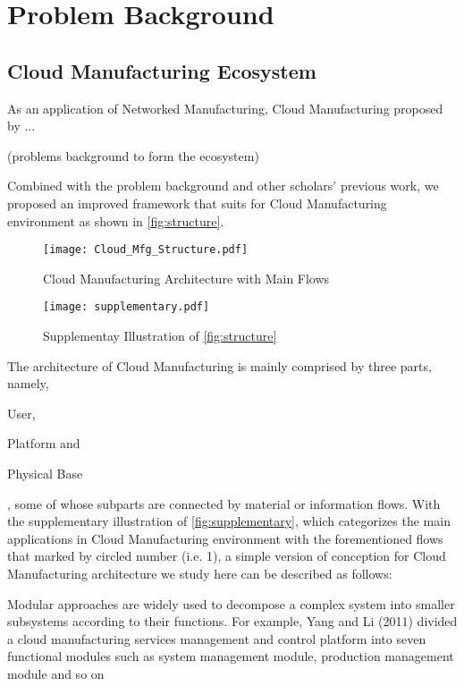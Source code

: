 \section{Problem Background} %
\label{sec:problem_background}

\subsection{Cloud Manufacturing Ecosystem} %
\label{sub:cloud_manufacturing_ecosystem}
As an application of Networked Manufacturing, Cloud Manufacturing proposed by ...

(problems background to form the ecosystem)

Combined with the problem background and other scholars' previous work, we proposed an improved framework that suits for Cloud Manufacturing environment as shown in \autoref{fig:structure}.
\begin{figure}[htbp]
\centering
\texttt{[image: Cloud\_Mfg\_Structure.pdf]}
\caption{Cloud Manufacturing Architecture with Main Flows}
\label{fig:structure}
\end{figure}

\begin{figure}[htbp]
\centering
\texttt{[image: supplementary.pdf]}
\caption{Supplementay Illustration of \autoref{fig:structure}}
\label{fig:supplementary}
\end{figure}

The architecture of Cloud Manufacturing is mainly comprised by three parts, namely, \begin{inparaenum}[1)]
\item User,
\item Platform and
\item Physical Base
\end{inparaenum}, some of whose subparts are connected by material or information flows. With the supplementary illustration of \autoref{fig:supplementary}, which categorizes the main applications in Cloud Manufacturing environment with the forementioned flows that marked by circled number (i.e. \textcircled{\small{1}}), a simple version of conception for Cloud Manufacturing architecture we study here can be described as follows:


Modular approaches are widely used to decompose a complex system into smaller subsystems according to their functions. For example, Yang and Li (2011) divided a cloud manufacturing services management and control platform into seven functional modules such as system management module, production management module and so on

